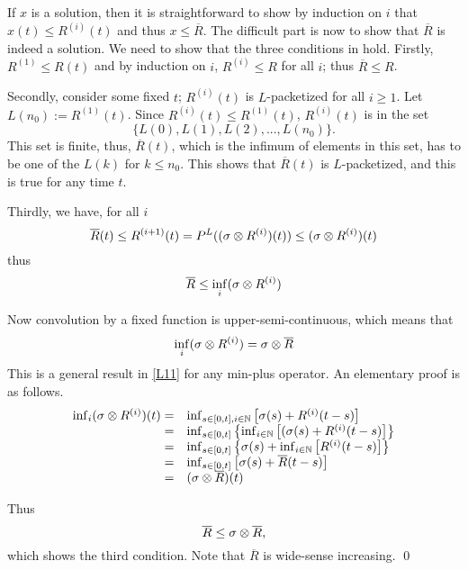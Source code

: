 If $x$ is a solution, then it is straightforward to show by
induction on $i$ that $x(t) \leq R^{(i)}(t)$ and thus $x \leq
\overline{R}$. The difficult part is now to show that
$\overline{R}$ is indeed a solution. We need to show that the
three conditions in  hold. Firstly, $R^{(1)}\leq
R(t)$ and by induction on $i$, $R^{(i)}\leq R$ for all $i$; thus
$\overline{R}\leq R$.

Secondly, consider some fixed $t$; $R^{(i)}(t)$ is $L$-packetized
for all $i \geq 1$. Let $L(n_0):= R^{(1)}(t)$. Since
$R^{(i)}(t)\leq R^{(1)}(t)$,  $R^{(i)}(t)$ is in the set
$$\{L(0),
L(1), L(2), ..., L(n_0)\}.$$ This set is finite, thus,
$\overline{R}(t)$, which is the infimum of elements in this set,
has to be one of the $L(k)$ for $k\leq n_0$. This shows that
$\overline{R}(t)$ is $L$-packetized, and this is true for any time
$t$.

Thirdly, we have, for all $i$
$$\overline{R}(t) \leq R^{(i+1)}(t) = P^L ((\sigma \otimes R^{(i)})(t)) \leq (\sigma \otimes
R^{(i)})(t)$$
 thus
 $$\overline{R} \leq \inf_{i} (\sigma \otimes
R^{(i)})$$

Now convolution by a fixed function is upper-semi-continuous,
which means that
$$\inf_{i} (\sigma \otimes
R^{(i)}) = \sigma \otimes \overline{R}$$ This is a general result in
\cref{L11} for any min-plus operator. An elementary proof is as
follows.
 $$
  \begin{array}{rl}
    \inf_i ( \sigma \otimes R^{(i)} )(t) = &
    \inf_{s \in [0,t], i \in \mathbb{N}}\left[\sigma(s) + R^{(i)}(t-s)\right] \\
    = &
    \inf_{s \in [0,t]} \left\{\inf_{i \in \mathbb{N}}
    \left[(\sigma(s) + R^{(i)}(t-s)\right] \right\}\\
    = &  \inf_{s \in [0,t]} \left\{\sigma(s) + \inf_{i \in \mathbb{N}}
    \left[R^{(i)}(t-s)\right] \right\}\\
    = & \inf_{s \in [0,t]} \left[\sigma(s) +  \overline{R}(t-s) \right]\\
    = & (\sigma \otimes \overline{R})(t)
  \end{array}
 $$


Thus
$$\overline{R} \leq \sigma \otimes \overline{R},$$
which shows the third condition. Note that $\overline{R}$ is
wide-sense increasing. \qed

%
%



